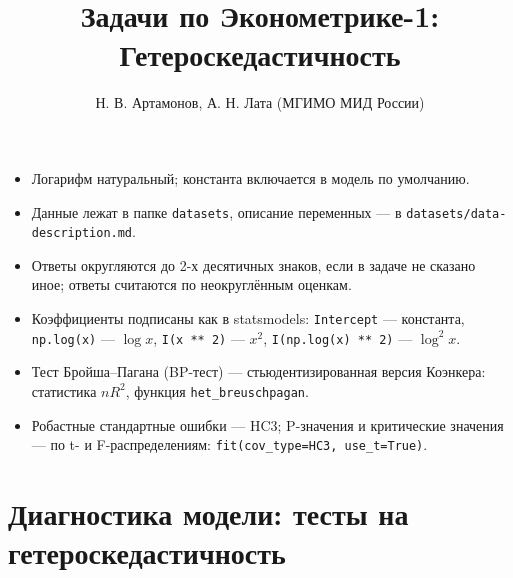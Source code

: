\documentclass[
  russian,
]{article}
\title{Задачи по Эконометрике-1: Гетероскедастичность}
\author{Н. В. Артамонов, А. Н. Лата (МГИМО МИД России)}
\date{}
\providecommand{\tightlist}{%
  \setlength{\itemsep}{0pt}\setlength{\parskip}{0pt}}
\renewcommand*\contentsname{Содержание}
\newcommand\contentsname{Содержание}
\begin{document}
\maketitle

\renewcommand*\contentsname{Содержание}
{
\setcounter{tocdepth}{3}
\tableofcontents
}

\begin{tcolorbox}[enhanced jigsaw, arc=.35mm, bottomrule=.15mm, bottomtitle=1mm, breakable, colback=white, colbacktitle=quarto-callout-important-color!10!white, colframe=quarto-callout-important-color-frame, coltitle=black, left=2mm, leftrule=.75mm, opacityback=0, opacitybacktitle=0.6, rightrule=.15mm, title=\textcolor{quarto-callout-important-color}{\faExclamation}\hspace{0.5em}{Важно}, titlerule=0mm, toprule=.15mm, toptitle=1mm]

\begin{itemize}
\tightlist
\item
  Логарифм натуральный; константа включается в модель по умолчанию.
\item
  Данные лежат в папке \texttt{datasets}, описание переменных --- в
  \texttt{datasets/data-description.md}.
\item
  Ответы округляются до 2-х десятичных знаков, если в задаче не сказано
  иное; ответы считаются по неокруглённым оценкам.
\item
  Коэффициенты подписаны как в statsmodels: \texttt{Intercept} ---
  константа, \texttt{np.log(x)} --- \(\log x\), \texttt{I(x\ **\ 2)} ---
  \(x^2\), \texttt{I(np.log(x)\ **\ 2)} --- \(\log^2 x\).
\item
  Тест Бройша--Пагана (BP-тест) --- стьюдентизированная версия Коэнкера:
  статистика \(nR^2\), функция \texttt{het\_breuschpagan}.
\item
  Робастные стандартные ошибки --- HC3; P-значения и критические
  значения --- по t- и F-распределениям:
  \texttt{fit(cov\_type=\textquotesingle{}HC3\textquotesingle{},\ use\_t=True)}.
\end{itemize}

\end{tcolorbox}

\section{Диагностика модели: тесты на
гетероскедастичность}\label{ux434ux438ux430ux433ux43dux43eux441ux442ux438ux43aux430-ux43cux43eux434ux435ux43bux438-ux442ux435ux441ux442ux44b-ux43dux430-ux433ux435ux442ux435ux440ux43eux441ux43aux435ux434ux430ux441ux442ux438ux447ux43dux43eux441ux442ux44c}
\end{document}

